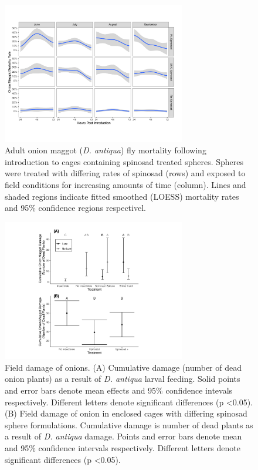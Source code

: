 \documentclass[alpha-refs]{wiley-article}
\begin{document}
\begin{figure}[bt]
\centering
\includegraphics[width = 8cm]{figures/final-figures/figure-3.pdf}
\caption{Adult onion maggot (\textit{D. antiqua}) fly mortality following introduction to cages containing spinosad treated spheres.  Spheres were treated with differing rates of spinosad (rows) and exposed to field conditions for increasing amounts of time (column).  Lines and shaded regions indicate fitted smoothed (LOESS) mortality rates and 95\% confidence regions respectivel.  }
\label{fig:figure3}
\end{figure}


\begin{figure}[bt]
\centering
\includegraphics[width = 8cm]{figures/final-figures/figure-4.pdf}
\caption{Field damage of onions.  (A) Cumulative damage (number of dead onion plants) as a result of \textit{D. antiqua} larval feeding.  Solid points and error bars denote mean effects and 95\% confidence intevals respectively.  Different letters denote significant differences (p \textless 0.05).  (B) Field damage of onion in enclosed cages with differing spinosad sphere formulations.  Cumulative damage is number of dead plants as a result of \textit{D. antiqua} damage.  Points and error bars denote mean and 95\% confidence intervals respectively.  Different letters denote significant differences (p \textless 0.05). } 
\label{fig:figure4}
\end{figure}
\end{document}
